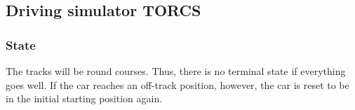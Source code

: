 
\subsection{Driving simulator TORCS}

\subsubsection{State}
\label{sec:state}


The tracks will be round courses. Thus, there is no terminal state if everything goes well. If the car reaches an off-track position, however, the car is reset to be in the initial starting position again.\\

